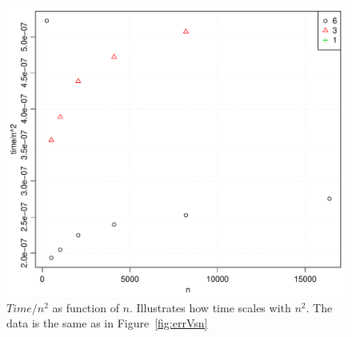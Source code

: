 %
\begin{figure}[h!]
\begin{center}
    \includegraphics[scale=0.5]{./Figures/timeOverN2Vsn.pdf}
\end{center}
\caption{$Time/n^2$ as function of $n$. Illustrates how time scales with $n^2$. The data is the same as in Figure~\ref{fig:errVsn}}
\label{fig:timeOverN2Vsn}
\end{figure}

